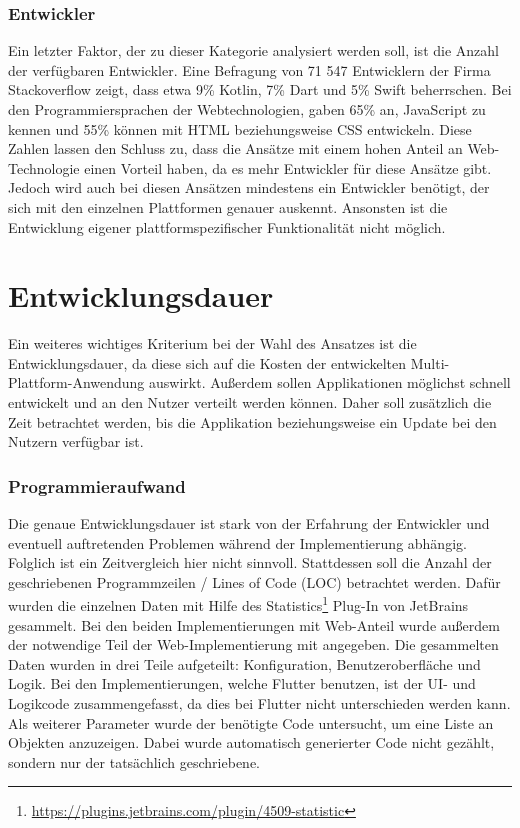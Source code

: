 \subsubsection{Entwickler}
Ein letzter Faktor, der zu dieser Kategorie analysiert werden soll, ist die Anzahl der verfügbaren Entwickler. Eine Befragung \cite{statist_used_programming_languages} von 71 547 Entwicklern der Firma Stackoverflow zeigt, dass etwa 9\% Kotlin, 7\% Dart und 5\% Swift beherrschen.
Bei den Programmiersprachen der Webtechnologien, gaben 65\% an, JavaScript zu kennen und 55\% können mit HTML beziehungsweise CSS entwickeln. Diese Zahlen lassen den Schluss zu, dass die Ansätze mit einem hohen Anteil an Web-Technologie einen Vorteil haben, da es mehr Entwickler für diese Ansätze gibt. Jedoch wird auch bei diesen Ansätzen mindestens ein Entwickler benötigt, der sich mit den einzelnen Plattformen genauer auskennt. 
Ansonsten ist die Entwicklung eigener plattformspezifischer Funktionalität nicht möglich.

\section{Entwicklungsdauer}
Ein weiteres wichtiges Kriterium bei der Wahl des Ansatzes ist die Entwicklungsdauer, da diese sich auf die Kosten der entwickelten Multi-Plattform-Anwendung auswirkt. Außerdem sollen Applikationen möglichst schnell entwickelt und an den Nutzer verteilt werden können. Daher soll zusätzlich die Zeit betrachtet werden, bis die Applikation beziehungsweise ein Update bei den Nutzern verfügbar ist.

\subsubsection{Programmieraufwand}
Die genaue Entwicklungsdauer ist stark von der Erfahrung der Entwickler und eventuell auftretenden Problemen während der Implementierung abhängig. Folglich ist ein Zeitvergleich hier nicht sinnvoll. Stattdessen soll die Anzahl der geschriebenen Programmzeilen / Lines of Code (LOC) betrachtet werden.
Dafür wurden die einzelnen Daten mit Hilfe des Statistics\footnote{\url{https://plugins.jetbrains.com/plugin/4509-statistic}} Plug-In von JetBrains gesammelt.
Bei den beiden Implementierungen mit Web-Anteil wurde außerdem der notwendige Teil der Web-Implementierung mit angegeben. 
Die gesammelten Daten wurden in drei Teile aufgeteilt: Konfiguration, Benutzeroberfläche und Logik. 
Bei den Implementierungen, welche Flutter benutzen, ist der UI- und Logikcode zusammengefasst, da dies bei Flutter nicht unterschieden werden kann.
Als weiterer Parameter wurde der benötigte Code untersucht, um eine Liste an Objekten anzuzeigen.
Dabei wurde automatisch generierter Code nicht gezählt, sondern nur der tatsächlich geschriebene.

